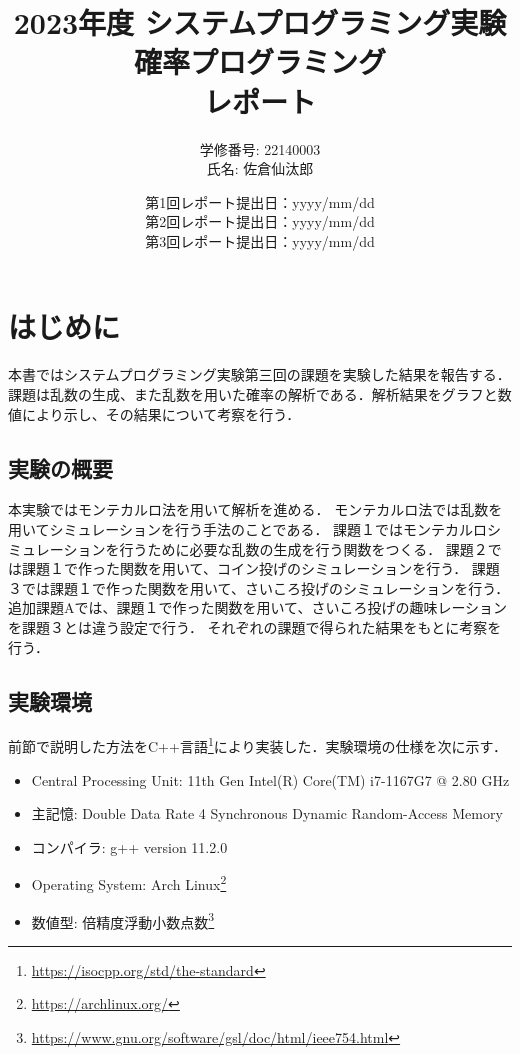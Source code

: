 \documentclass[fleqn, a4paper. 12pt]{ltjsarticle} %
\title{
2023年度 システムプログラミング実験\\
確率プログラミング\\
レポート}
\author{
学修番号: 22140003 \\
氏名: 佐倉仙汰郎 \\
}
\begin{document}
\date{
第1回レポート提出日：yyyy/mm/dd \\
第2回レポート提出日：yyyy/mm/dd \\
第3回レポート提出日：yyyy/mm/dd \\
}
\maketitle

\section*{はじめに}
本書ではシステムプログラミング実験第三回の課題を実験した結果を報告する．課題は乱数の生成、また乱数を用いた確率の解析である．解析結果をグラフと数値により示し、その結果について考察を行う．
\subsection*{実験の概要}

本実験ではモンテカルロ法を用いて解析を進める．
モンテカルロ法では乱数を用いてシミュレーションを行う手法のことである．
課題１ではモンテカルロシミュレーションを行うために必要な乱数の生成を行う関数をつくる．
課題２では課題１で作った関数を用いて、コイン投げのシミュレーションを行う．
課題３では課題１で作った関数を用いて、さいころ投げのシミュレーションを行う．
追加課題Aでは、課題１で作った関数を用いて、さいころ投げの趣味レーションを課題３とは違う設定で行う．
それぞれの課題で得られた結果をもとに考察を行う．

\subsection*{実験環境}
前節で説明した方法をC++言語\footnote{\url{https://isocpp.org/std/the-standard}}により実装した．実験環境の仕様を次に示す．
\begin{itemize}
    \item Central Processing Unit: 11th Gen Intel(R) Core(TM) i7-1167G7 @ 2.80 GHz
    \item 主記憶: Double Data Rate 4 Synchronous Dynamic Random-Access Memory
    \item コンパイラ: g++ version 11.2.0
    \item Operating System: Arch Linux\footnote{\url{https://archlinux.org/}}
    \item 数値型: 倍精度浮動小数点数\footnote{\url{https://www.gnu.org/software/gsl/doc/html/ieee754.html}}
  \end{itemize}
\newpage
\end{document}
